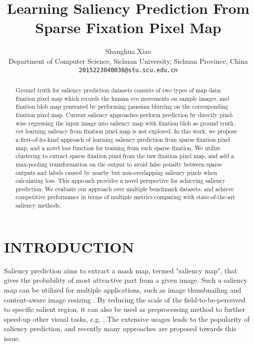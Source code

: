 \documentclass[letterpaper, 10 pt, conference]{ieeeconf}  %
\title{\LARGE \bf
Learning Saliency Prediction From Sparse Fixation Pixel Map
}
\author{Shanghua Xiao
\\ Department of Computer Science, Sichuan University, Sichuan Province, China \\
{\tt 2015223040036@stu.scu.edu.cn}
}
\begin{document}
\maketitle
\thispagestyle{plain}
\pagestyle{plain}

\begin{abstract}
Ground truth for saliency prediction datasets consists of two types of map data: fixation pixel map which records the human eye movements on sample images, and fixation blob map generated by performing gaussian blurring on the corresponding fixation pixel map. Current saliency approaches perform prediction by directly pixel-wise regressing the input image into saliency map with fixation blob as ground truth, yet learning saliency from fixation pixel map is not explored. In this work, we propose a first-of-its-kind approach of learning saliency prediction from sparse fixation pixel map, and a novel loss function for training from such sparse fixation. We utilize clustering to extract sparse fixation pixel from the raw fixation pixel map, and add a max-pooling transformation on the output to avoid false penalty between sparse outputs and labels caused by nearby but non-overlapping saliency pixels when calculating loss. This approach provides a novel perspective for achieving saliency prediction. We evaluate our approach over multiple benchmark datasets, and achieve competitive performance in terms of multiple metrics comparing with state-of-the-art saliency methods.
\end{abstract}

\section{INTRODUCTION}

\par Saliency prediction aims to extract a mask map, termed "saliency map", that gives the probability of most attractive part from a given image. Such a saliency map can be utilized for multiple applications, such as image thumbnailing \cite{b1} and content-aware image resizing \cite{b2}. By reducing the scale of the field-to-be-perceived to specific salient region, it can also be used as preprocessing method to further speed-up other visual tasks, e.g. \cite{b3,b4}. The extensive usages leads to the popularity of saliency prediction, and recently many approaches are proposed towards this issue.
\end{document}
